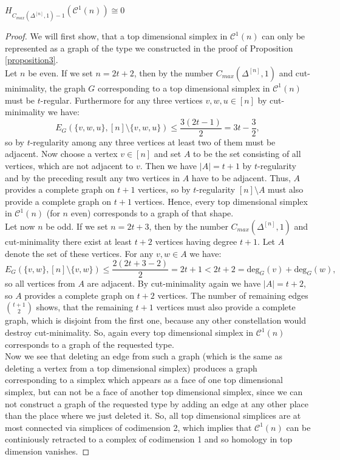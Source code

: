 \begin{thm}\label{theorem3}
\(H_{C_{max}(\Delta^{[n]},1)-1}(\mathcal{C}^1(n))\cong 0\)
\begin{proof}
We will first show, that a top dimensional simplex in \(\mathcal{C}^1(n)\) can only be represented as a graph of the type we constructed in the proof of Proposition \ref{proposition3}.\\
Let \(n\) be even. If we set \(n=2t+2\), then by the number \(C_{max}(\Delta^{[n]},1)\) and cut-minimality, the graph \(G\) corresponding to a top dimensional simplex in \(\mathcal{C}^1(n)\) must be \(t\)-regular. Furthermore for any three vertices \(v,w,u\in [n]\) by cut-minimality we have:
\[
E_G(\{v,w,u\},[n]\setminus\{v,w,u\})\leq\frac{3(2t-1)}{2}=3t-\frac{3}{2},
\]
so by \(t\)-regularity among any three vertices at least two of them must be adjacent. Now choose a vertex \(v\in [n]\) and set \(A\) to be the set consisting of all vertices, which are not adjacent to \(v\). Then we have \(|A|=t+1\) by \(t\)-regularity and by the preceding result any two vertices in \(A\) have to be adjacent. Thus, \(A\) provides a complete graph on \(t+1\) vertices, so by \(t\)-regularity \([n]\setminus A\) must also provide a complete graph on \(t+1\) vertices. Hence, every top dimensional simplex in \(\mathcal{C}^1(n)\) (for \(n\) even) corresponds to a graph of that shape.\\
Let now \(n\) be odd. If we set \(n=2t+3\), then by the number \(C_{max}(\Delta^{[n]},1)\) and cut-minimality there exist at least \(t+2\) vertices having degree \(t+1\). Let \(A\) denote the set of these vertices. For any \(v,w\in A\) we have:
\[
E_G(\{v,w\},[n]\setminus\{v,w\})\leq\frac{2(2t+3-2)}{2}=2t+1<2t+2=\text{deg}_G(v)+\text{deg}_G(w),
\]
so all vertices from \(A\) are adjacent. By cut-minimality again we have \(|A|=t+2\), so \(A\) provides a complete graph on \(t+2\) vertices. The number of remaining edges \(\binom{t+1}{2}\) shows, that the remaining \(t+1\) vertices must also provide a complete graph, which is disjoint from the first one, because any other constellation would destroy cut-minimality. So, again every top dimensional simplex in \(\mathcal{C}^1(n)\) corresponds to a graph of the requested type.\\
Now we see that deleting an edge from such a graph (which is the same as deleting a vertex from a top dimensional simplex) produces a graph corresponding to a simplex which appears as a face of one top dimensional simplex, but can not be a face of another top dimensional simplex, since we can not construct a graph of the requested type by adding an edge at any other place than the place where we just deleted it. So, all top dimensional simplices are at most connected via simplices of codimension 2, which implies that \(\mathcal{C}^1(n)\) can be continiously retracted to a complex of codimension 1 and so homology in top dimension vanishes.
\end{proof}
\end{thm}
